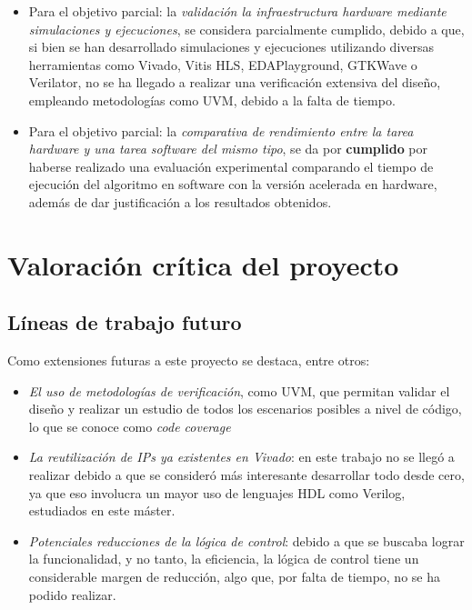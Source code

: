 \begin{itemize}
    \item Para el objetivo parcial: la \emph{validación la infraestructura hardware mediante simulaciones y ejecuciones}, se considera parcialmente cumplido, debido a que, si bien se han desarrollado simulaciones y ejecuciones utilizando diversas herramientas como Vivado, Vitis HLS, EDAPlayground, GTKWave o Verilator, no se ha llegado a realizar una verificación extensiva del diseño, empleando metodologías como \ac{UVM}, debido a la falta de tiempo.
    
    \item Para el objetivo parcial: la \emph{comparativa de rendimiento entre la tarea hardware y una tarea software del mismo tipo}, se da por \textbf{cumplido} por haberse realizado una evaluación experimental comparando el tiempo de ejecución del algoritmo en software con la versión acelerada en hardware, además de dar justificación a los resultados obtenidos.
\end{itemize}

\section{Valoración crítica del proyecto}
\subsection{Líneas de trabajo futuro}
Como extensiones futuras a este proyecto se destaca, entre otros:

\begin{itemize}
  \item \emph{El uso de metodologías de verificación}, como UVM, que permitan validar el diseño y realizar un estudio de todos los escenarios posibles a nivel de código, lo que se conoce como \textit{code coverage}
  \item \emph{La reutilización de IPs ya existentes en Vivado}: en este trabajo no se llegó a realizar debido a que se consideró más interesante desarrollar todo desde cero, ya que eso involucra un mayor uso de lenguajes HDL como Verilog, estudiados en este máster.
  \item \emph{Potenciales reducciones de la lógica de control}: debido a que se buscaba lograr la funcionalidad, y no tanto, la eficiencia, la lógica de control tiene un considerable margen de reducción, algo que, por falta de tiempo, no se ha podido realizar.
\end{itemize}

